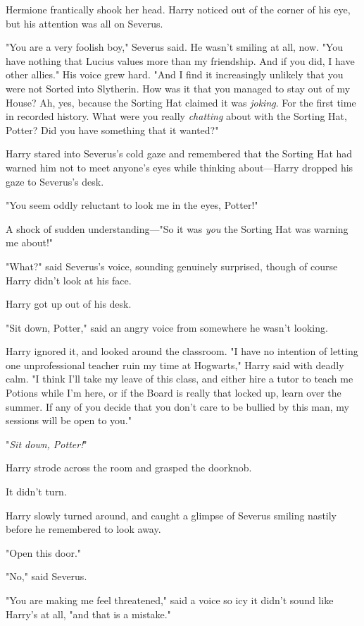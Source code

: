 Hermione frantically shook her head. Harry noticed out of the corner of his
eye, but his attention was all on Severus.

"You are a very foolish boy," Severus said. He wasn't smiling at all, now. "You
have nothing that Lucius values more than my friendship. And if you did, I have
other allies." His voice grew hard. "And I find it increasingly unlikely that
you were not Sorted into Slytherin. How was it that you managed to stay out of
my House? Ah, yes, because the Sorting Hat claimed it was \emph{joking}. For
the first time in recorded history. What were you really \emph{chatting} about
with the Sorting Hat, Potter? Did you have something that it wanted?"

Harry stared into Severus's cold gaze and remembered that the Sorting Hat had
warned him not to meet anyone's eyes while thinking about---Harry dropped his
gaze to Severus's desk.

"You seem oddly reluctant to look me in the eyes, Potter!"

A shock of sudden understanding\mbox{---}"So it was \emph{you} the Sorting Hat was
warning me about!"

"What?" said Severus's voice, sounding genuinely surprised, though of course
Harry didn't look at his face.

Harry got up out of his desk.

"Sit down, Potter," said an angry voice from somewhere he wasn't looking.

Harry ignored it, and looked around the classroom. "I have no intention of
letting one unprofessional teacher ruin my time at Hogwarts," Harry said with
deadly calm. "I think I'll take my leave of this class, and either hire a tutor
to teach me Potions while I'm here, or if the Board is really that locked up,
learn over the summer. If any of you decide that you don't care to be bullied
by this man, my sessions will be open to you."

"\emph{Sit down, Potter!}"

Harry strode across the room and grasped the doorknob.

It didn't turn.

Harry slowly turned around, and caught a glimpse of Severus smiling nastily
before he remembered to look away.

"Open this door."

"No," said Severus.

"You are making me feel threatened," said a voice so icy it didn't sound like
Harry's at all, "and that is a mistake."

